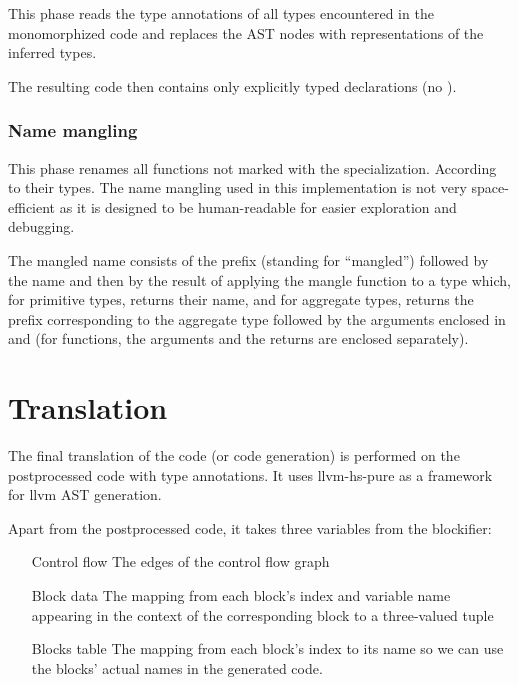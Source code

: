 This phase reads the type annotations of all types encountered in the monomorphized code and replaces the AST nodes with representations of the inferred types.

The resulting code then contains only explicitly typed declarations (no ).

\subsubsection{Name mangling}

This phase renames all functions not marked with the  specialization. According to their types. The name mangling used in this implementation is not very space-efficient as it is designed to be human-readable for easier exploration and debugging.

\begin{defn}
    The mangled name consists of the  prefix (standing for ``mangled'') followed by the name and then by the result of applying the mangle function to a type which, for primitive types, returns their name, and for aggregate types, returns the prefix corresponding to the aggregate type followed by the arguments enclosed in  and  (for functions, the arguments and the returns are enclosed separately).
\end{defn}



\section{Translation}

The final translation of the code (or code generation) is performed on the postprocessed code with type annotations. It uses  llvm-hs-pure as a framework for llvm AST generation.

Apart from the postprocessed code, it takes three variables from the blockifier:


\begin{enumerate}
    \item[Control flow] The edges of the control flow graph
    \item[Block data] The mapping from each block's index and variable name appearing in the context of the corresponding block to a three-valued tuple \linebreak {}
    \item[Blocks table] The mapping from each block's index to its name so we can use the blocks' actual names in the generated code.
\end{enumerate}

